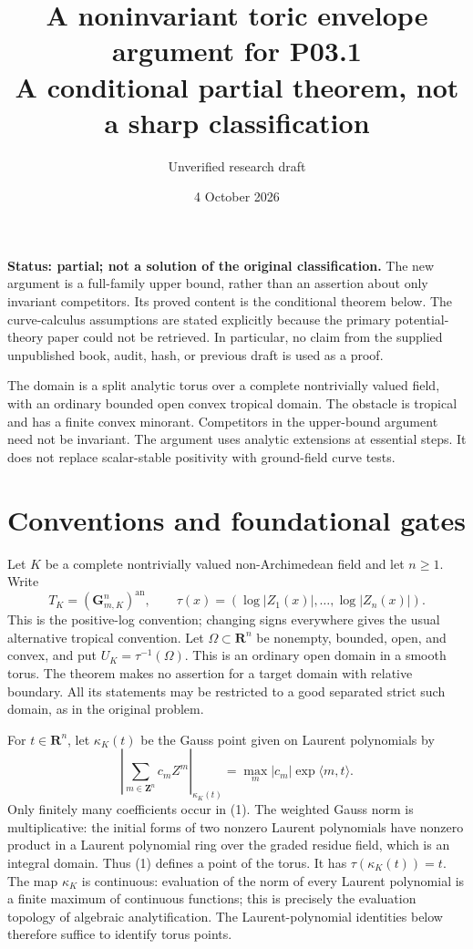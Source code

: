 \documentclass[11pt]{article}
\title{A noninvariant toric envelope argument for P03.1\\
\large A conditional partial theorem, not a sharp classification}
\author{Unverified research draft}
\date{4 October 2026}
\begin{document}
\maketitle

\textbf{Status: partial; not a solution of the original classification.} The new argument is a full-family upper bound, rather than an assertion about only invariant competitors. Its proved content is the conditional theorem below. The curve-calculus assumptions are stated explicitly because the primary potential-theory paper could not be retrieved. In particular, no claim from the supplied unpublished book, audit, hash, or previous draft is used as a proof.

The domain is a split analytic torus over a complete nontrivially valued field, with an ordinary bounded open convex tropical domain. The obstacle is tropical and has a finite convex minorant. Competitors in the upper-bound argument need not be invariant. The argument uses analytic extensions at essential steps. It does not replace scalar-stable positivity with ground-field curve tests.

\section{Conventions and foundational gates}

Let \(K\) be a complete nontrivially valued non-Archimedean field and let \(n\geq 1\). Write
\[
T_K=(\mathbf G_{m,K}^n)^{\mathrm{an}},\qquad
\tau(x)=(\log|Z_1(x)|,\ldots,\log|Z_n(x)|).
\]
This is the positive-log convention; changing signs everywhere gives the usual alternative tropical convention. Let \(\Omega\subset\mathbf R^n\) be nonempty, bounded, open, and convex, and put \(U_K=\tau^{-1}(\Omega)\). This is an ordinary open domain in a smooth torus. The theorem makes no assertion for a target domain with relative boundary. All its statements may be restricted to a good separated strict such domain, as in the original problem.

For \(t\in\mathbf R^n\), let \(\kappa_K(t)\) be the Gauss point given on Laurent polynomials by
\[
\left|\sum_{m\in\mathbf Z^n}c_m Z^m\right|_{\kappa_K(t)}
=\max_m |c_m|\exp\langle m,t\rangle.
\tag{1}
\]
Only finitely many coefficients occur in (1). The weighted Gauss norm is multiplicative: the initial forms of two nonzero Laurent polynomials have nonzero product in a Laurent polynomial ring over the graded residue field, which is an integral domain. Thus (1) defines a point of the torus. It has \(\tau(\kappa_K(t))=t\). The map \(\kappa_K\) is continuous: evaluation of the norm of every Laurent polynomial is a finite maximum of continuous functions; this is precisely the evaluation topology of algebraic analytification. The Laurent-polynomial identities below therefore suffice to identify torus points.
\end{document}

